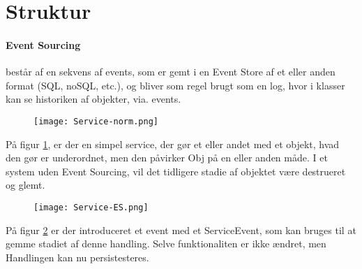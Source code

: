 \section{Struktur}

\paragraph{Event Sourcing} består af en sekvens af events, som er gemt i en Event Store af et eller anden format (SQL, noSQL, etc.), og bliver som regel brugt som en log, hvor i klasser kan se historiken af objekter, via. events. 

\begin{figure}[H]
    \centering
    \texttt{[image: Service-norm.png]}
    \label{fig:service-model}
\end{figure}

På figur \ref{fig:service-model}, er der en simpel service, der gør et eller andet med et objekt, hvad den gør er underordnet, men den påvirker Obj på en eller anden måde. I et system uden Event Sourcing, vil det tidligere stadie af objektet være destrueret og glemt.

\begin{figure}[H]
    \centering
    \texttt{[image: Service-ES.png]}
    \label{fig:service-ES-model}
\end{figure}

På figur \ref{fig:service-ES-model} er der introduceret et event med et ServiceEvent, som kan bruges til at gemme stadiet af denne handling. Selve funktionaliten er ikke ændret, men Handlingen kan nu persistesteres. 